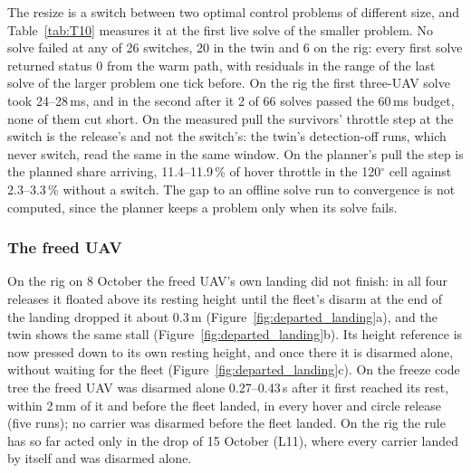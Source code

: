The resize is a switch between two optimal control problems of different size, and Table~\ref{tab:T10} measures it at
the first live solve of the smaller problem. No solve failed at any of 26 switches, 20 in the twin and 6 on the rig:
every first solve returned status 0 from the warm path, with residuals in the range of the last solve of the larger
problem one tick before. On the rig the first three-UAV solve took 24--28\,ms, and in the second after it 2 of 66
solves passed the 60\,ms budget, none of them cut short. On the measured pull the survivors' throttle step at the
switch is the release's and not the switch's: the twin's detection-off runs, which never switch, read the same in the
same window. On the planner's pull the step is the planned share arriving, 11.4--11.9\,\% of hover throttle in the
120$^\circ$ cell against 2.3--3.3\,\% without a switch. The gap to an offline solve run to convergence is not computed, since the planner keeps a
problem only when its solve fails.



\subsubsection{The freed UAV}
\label{sec:res_freed}

On the rig on 8 October the freed UAV's own landing did not finish: in all four releases it floated above its resting
height until the fleet's disarm at the end of the landing dropped it about 0.3\,m (Figure~\ref{fig:departed_landing}a),
and the twin shows the same stall (Figure~\ref{fig:departed_landing}b). Its height reference is now pressed down to its
own resting height, and once there it is disarmed alone, without waiting for the fleet
(Figure~\ref{fig:departed_landing}c). On the freeze code tree the freed UAV was disarmed alone 0.27--0.43\,s after it
first reached its rest, within 2\,mm of it and before the fleet landed, in every hover and circle release (five runs);
no carrier was disarmed before the fleet landed. On the rig the rule has so far acted only in the drop of 15 October
(L11), where every carrier landed by itself and was disarmed alone.

